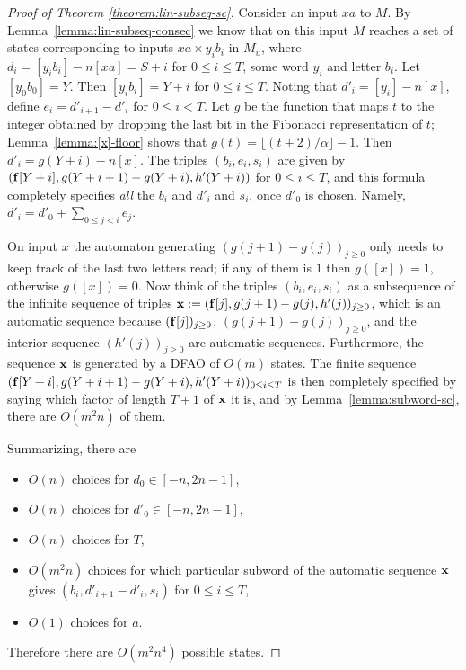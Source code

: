 \documentclass[12pt,reqno]{article}
\begin{document}
\begin{proof}[Proof of Theorem \ref{theorem:lin-subseq-sc}]
Consider an input $xa$ to $M$.
By Lemma~\ref{lemma:lin-subseq-consec} we know that
on this input $M$ reaches a set of
states corresponding to inputs $xa\times y_i b_i$ in $M_u$, where $d_i = [y_i b_i]-n[xa]=  S+i$  for
$0 \leq i \leq T$, some word $y_i$ and letter $b_i$.  Let $[y_0 b_0] = Y$.  Then $[y_i b_i] = Y+i$
for $0 \leq i \leq T$.  Noting that
$d'_i = [y_i] - n[x]$, 
define $e_i = d'_{i+1} - d'_i$ for $0 \leq i < T$. 
Let $g$ be the function that
maps $t$ to the integer obtained by dropping the last
bit in the Fibonacci representation of $t$; Lemma~\ref{lemma:[x]-floor}
shows that $g(t) = \lfloor (t+2)/\alpha \rfloor - 1$.
Then $d'_i = g(Y+i) -n[x]$.
The triples $(b_i, e_i, s_i )$ are given by $({\bf f}[Y+i], g(Y+i+1)-g(Y+i), h'(Y+i))$
for $0 \leq i \leq T$, and this formula completely specifies {\it all\/} the $b_i$ and $d'_i$ and $s_i$,
once $d'_0$ is chosen.  Namely,
$d'_i = d'_0 + \sum_{0 \leq j < i} e_j$.

On input $x$ the automaton generating $(g(j+1)-g(j))_{j \geq 0}$ only needs to keep track of the last two letters read; if any of them is $1$ then $g([x]) = 1$, otherwise $g([x]) =0$. 
Now think of the triples $(b_i, e_i, s_i)$  as a subsequence of the infinite sequence of triples 
${\bf x} := ({\bf f}[j], g(j+1)-g(j), h'(j))_{j\geq 0}$, which 
is an automatic sequence because $({\bf f}[j])_{j \geq 0}$, $(g(j+1)-g(j))_{j \geq 0}$, and the interior sequence $(h'(j))_{j\geq 0}$ are automatic sequences.
Furthermore, the sequence ${\bf x}$ is generated by a DFAO of $O(m)$ states.
The finite sequence
$({\bf f}[Y+i], g(Y+i+1)-g(Y+i), h'(Y+i))_{0 \leq i \leq T}$ is then completely specified by saying which factor of length $T+1$ of $\bf x$ it is, and by
Lemma~\ref{lemma:subword-sc}, there are $O(m^2n)$ of them.

Summarizing, there are
\begin{itemize}
\item[(a)] $O(n)$ choices for $d_0 \in [-n, 2n-1]$,
\item[(b)] $O(n)$ choices for $d'_0 \in [-n, 2n-1]$,
\item[(c)] $O(n)$ choices for $T$,
\item[(d)] $O(m^2n)$ choices for which particular subword of the automatic sequence $\bf x$ gives $(b_i, d'_{i+1}-d'_i, s_i)$ for $0 \leq i \leq T$,
\item[(e)] $O(1)$ choices for $a$.
\end{itemize}

Therefore there are $O(m^2n^4)$ possible states.
\end{proof}
\end{document}
